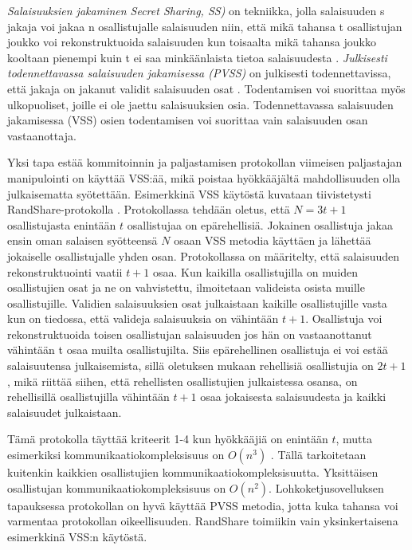\textit{Salaisuuksien jakaminen Secret Sharing, SS)} on tekniikka, jolla salaisuuden s jakaja voi jakaa n osallistujalle salaisuuden niin, että mikä tahansa t osallistujan joukko voi rekonstruktuoida salaisuuden kun toisaalta mikä tahansa joukko kooltaan pienempi kuin t ei saa minkäänlaista tietoa salaisuudesta \cite{shamir_how_1979}. \textit{Julkisesti todennettavassa salaisuuden jakamisessa (PVSS)} on julkisesti todennettavissa, että jakaja on jakanut validit salaisuuden osat \cite{StadlerMarkus2001PVSS}. Todentamisen voi suorittaa myös ulkopuoliset, joille ei ole jaettu salaisuuksien osia. Todennettavassa salaisuuden jakamisessa (VSS) osien todentamisen voi suorittaa vain salaisuuden osan vastaanottaja.

Yksi tapa estää kommitoinnin ja paljastamisen protokollan viimeisen paljastajan manipulointi on käyttää VSS:ää, mikä poistaa hyökkääjältä mahdollisuuden olla julkaisematta syötettään. Esimerkkinä VSS käytöstä kuvataan tiivistetysti RandShare-protokolla \cite{syta_scalable_2017}. Protokollassa tehdään oletus, että $N = 3t+1$ osallistujasta enintään $t$ osallistujaa on epärehellisiä. Jokainen osallistuja jakaa ensin oman salaisen syötteensä $N$ osaan VSS metodia käyttäen ja lähettää jokaiselle osallistujalle yhden osan. Protokollassa on määritelty, että salaisuuden rekonstruktuointi vaatii $t+1$ osaa. Kun kaikilla osallistujilla on muiden osallistujien osat ja ne on vahvistettu, ilmoitetaan valideista osista muille osallistujille. Validien salaisuuksien osat julkaistaan kaikille osallistujille vasta kun on tiedossa, että valideja salaisuuksia on vähintään $t+1$. Osallistuja voi rekonstruktuoida toisen osallistujan salaisuuden jos hän on vastaanottanut vähintään t osaa muilta osallistujilta. Siis epärehellinen osallistuja ei voi estää salaisuutensa julkaisemista, sillä oletuksen mukaan rehellisiä osallistujia on $2t+1$, mikä riittää siihen, että rehellisten osallistujien julkaistessa osansa, on rehellisillä osallistujilla vähintään $t+1$ osaa jokaisesta salaisuudesta ja kaikki salaisuudet julkaistaan.

Tämä protokolla täyttää kriteerit 1-4 kun hyökkääjiä on enintään $t$, mutta esimerkiksi kommunikaatiokompleksisuus on $O(n^3)$ \cite{syta_scalable_2017}. Tällä tarkoitetaan kuitenkin kaikkien osallistujien kommunikaatiokompleksisuutta. Yksittäisen osallistujan kommunikaatiokompleksisuus on $O(n^2)$. Lohkoketjusovelluksen tapauksessa protokollan on hyvä käyttää PVSS metodia, jotta kuka tahansa voi varmentaa protokollan oikeellisuuden. RandShare toimiikin vain yksinkertaisena esimerkkinä VSS:n käytöstä. 

